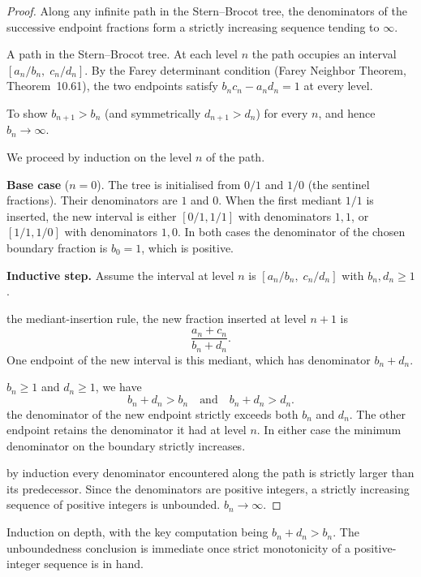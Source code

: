 \begin{proof}
\Claim Along any infinite path in the Stern--Brocot tree, the denominators
of the successive endpoint fractions form a strictly increasing sequence
tending to $\infty$.

\Given A path in the Stern--Brocot tree.  At each level $n$ the path
occupies an interval $[a_n/b_n,\; c_n/d_n]$.  By the Farey determinant
condition (Farey Neighbor Theorem, Theorem~10.61), the two endpoints satisfy
$b_n c_n - a_n d_n = 1$ at every level.

\Goal To show $b_{n+1} > b_n$ (and symmetrically $d_{n+1} > d_n$) for
every $n$, and hence $b_n \to \infty$.

\Strategy We proceed by induction on the level $n$ of the path.

\textbf{Base case} ($n = 0$). The tree is initialised from $0/1$ and $1/0$
(the sentinel fractions). Their denominators are $1$ and $0$. When the
first mediant $1/1$ is inserted, the new interval is either $[0/1, 1/1]$
with denominators $1, 1$, or $[1/1, 1/0]$ with denominators $1, 0$.
In both cases the denominator of the chosen boundary fraction is $b_0 = 1$,
which is positive. \checkbox

\textbf{Inductive step.} Assume the interval at level $n$ is
$[a_n/b_n,\; c_n/d_n]$ with $b_n, d_n \ge 1$.

\ByDef the mediant-insertion rule, the new fraction inserted at level
$n+1$ is
\[
  \frac{a_n + c_n}{b_n + d_n}.
\]
One endpoint of the new interval is this mediant, which has denominator
$b_n + d_n$.

\ByAss $b_n \ge 1$ and $d_n \ge 1$, we have
\[
  b_n + d_n > b_n \quad \text{and} \quad b_n + d_n > d_n.
\]
\Therefore the denominator of the new endpoint strictly exceeds both
$b_n$ and $d_n$. The other endpoint retains the denominator it had
at level $n$.  In either case the minimum denominator on the boundary
strictly increases. \checkbox

\Hence by induction every denominator encountered along the path is
strictly larger than its predecessor.  Since the denominators are positive
integers, a strictly increasing sequence of positive integers is unbounded.
\Therefore $b_n \to \infty$. \AsReq
\end{proof}

\begin{remark*}
Induction on depth, with the key computation being $b_n + d_n > b_n$.
The unboundedness conclusion is immediate once strict monotonicity of a
positive-integer sequence is in hand.
\end{remark*}

